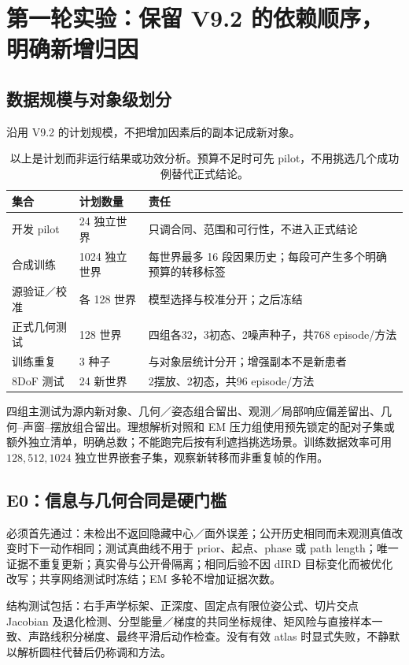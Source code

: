 \documentclass[UTF8,fontset=fandol,11pt,a4paper]{ctexart}
\theoremstyle{plain}
\theoremstyle{definition}
\theoremstyle{remark}
\numberwithin{equation}{section}
\begin{document}
\section{第一轮实验：保留 V9.2 的依赖顺序，明确新增归因}
\label{sec:experiments}
\subsection{数据规模与对象级划分}
沿用 V9.2 的计划规模，不把增加因素后的副本记成新对象。
\begin{table}[htbp]\centering\small
\begin{tabularx}{\linewidth}{P{31mm}P{31mm}Y}\toprule
集合 & 计划数量 & 责任\\\midrule
开发 pilot & 24 独立世界 & 只调合同、范围和可行性，不进入正式结论\\
合成训练 & 1024 独立世界 & 每世界最多 16 段因果历史；每段可产生多个明确预算的转移标签\\
源验证／校准 & 各 128 世界 & 模型选择与校准分开；之后冻结\\
正式几何测试 & 128 世界 & 四组各32，3初态、2噪声种子，共768 episode/方法\\
训练重复 & 3 种子 & 与对象层统计分开；增强副本不是新患者\\
8DoF 测试 & 24 新世界 & 2摆放、2初态，共96 episode/方法\\\bottomrule
\end{tabularx}
\caption{以上是计划而非运行结果或功效分析。预算不足时可先 pilot，不用挑选几个成功例替代正式结论。}
\end{table}

四组主测试为源内新对象、几何／姿态组合留出、观测／局部响应偏差留出、几何--声窗--摆放组合留出。理想解析对照和 EM 压力组使用预先锁定的配对子集或额外独立清单，明确总数；不能跑完后按有利遮挡挑选场景。训练数据效率可用 $128,512,1024$ 独立世界嵌套子集，观察新转移而非重复帧的作用。

\subsection{E0：信息与几何合同是硬门槛}
必须首先通过：未检出不返回隐藏中心／面外误差；公开历史相同而未观测真值改变时下一动作相同；测试真曲线不用于 prior、起点、phase 或 path length；唯一证据不重复更新；真实骨与公开骨隔离；相同后验不因 dIRD 目标变化而被优化改写；共享网络测试时冻结；EM 多轮不增加证据次数。

结构测试包括：右手声学标架、正深度、固定点有限位姿公式、切片交点 Jacobian 及退化检测、分型能量／梯度的共同坐标规律、矩风险与直接样本一致、声路线积分梯度、最终平滑后动作检查。没有有效 atlas 时显式失败，不静默以解析圆柱代替后仍称调和方法。
\end{document}
